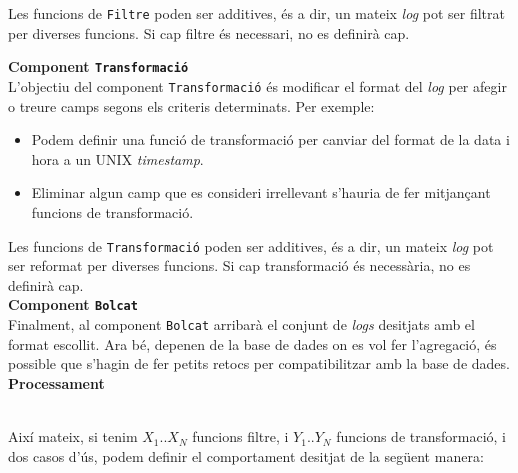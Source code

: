 \noindent
Les funcions de \texttt{Filtre} poden ser additives, és a dir, un mateix \textit{\gls{log}} pot ser filtrat per diverses funcions.
Si cap filtre és necessari, no es definirà cap. \\

\clearpage

\noindent
\textbf{Component \texttt{Transformació}} \\

\noindent
L’objectiu del component \texttt{Transformació} és modificar el format del \textit{\gls{log}} per afegir o treure camps segons els criteris determinats.
Per exemple:

\begin{itemize}
    \item Podem definir una funció de transformació per canviar del format de la data i hora a un UNIX \textit{\gls{timestamp}}.
    \item Eliminar algun camp que es consideri irrellevant s’hauria de fer mitjançant funcions de transformació.
\end{itemize}

\noindent
Les funcions de \texttt{Transformació} poden ser additives, és a dir, un mateix \textit{\gls{log}} pot ser reformat per diverses funcions.
Si cap transformació és necessària, no es definirà cap. \\

\noindent
\textbf{Component \texttt{Bolcat}} \\

\noindent
Finalment, al component \texttt{Bolcat} arribarà el conjunt de \textit{\gls{log}s} desitjats amb el format escollit.
Ara bé, depenen de la base de dades on es vol fer l’agregació, és possible que s’hagin de fer petits retocs per compatibilitzar amb la base de dades. \\

\noindent
\textbf{Processament}

\noindent \\
Així mateix, si tenim \(X_1\)..\(X_N\) funcions filtre, i \(Y_1\)..\(Y_N\) funcions de transformació, i dos casos d’ús, podem definir el comportament desitjat de la següent manera:

